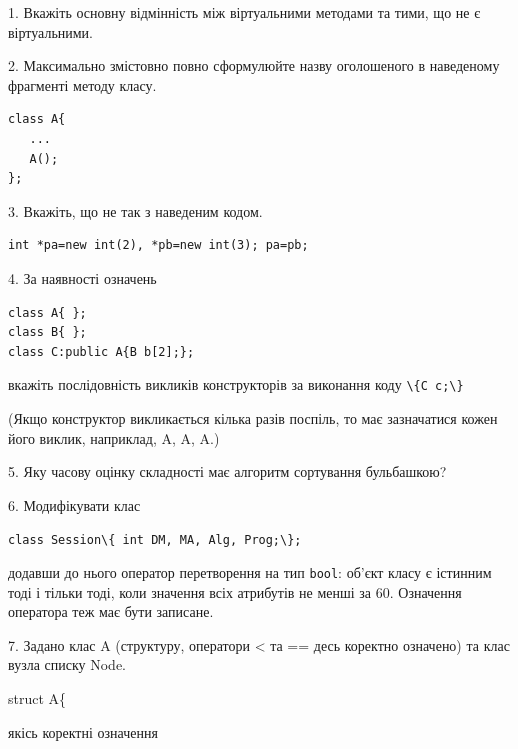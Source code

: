 \documentclass[12pt, ukrainian]{article}
\def\code#1{\Verb!#1!}
\begin{document}
{%
1. Вкажіть основну відмінність між віртуальними методами та тими, що не є віртуальними.%
\par
\vspace{2mm}
2. Максимально змістовно повно сформулюйте назву оголошеного в наведеному фрагменті методу класу.
\vspace{-3mm}
\begin{verbatim}class A{
   ...
   A();
};\end{verbatim}
\vspace{-3mm}
\par
\vspace{2mm}
3. Вкажіть, що не так з наведеним кодом.
\vspace{-3mm}
\begin{verbatim}int *pa=new int(2), *pb=new int(3); pa=pb;\end{verbatim}
\vspace{-3mm}
\par
\vspace{2mm}
4. За наявності означень
\vspace{-3mm}
\begin{verbatim}
class A{ };
class B{ };
class C:public A{B b[2];};\end{verbatim}
\vspace{-3mm}
вкажіть послідовність викликів конструкторів за виконання коду \code{\{C c;\}} 

(Якщо конструктор викликається кілька разів поспіль, то має зазначатися кожен його виклик, наприклад, A, A, A.)

\vspace{2mm}
5. Яку часову оцінку складності має алгоритм сортування бульбашкою?
\par
\vspace{2mm}
6. Модифікувати клас 

\qquad\code{class Session\{ int DM, MA, Alg, Prog;\};} 


додавши до нього оператор перетворення на тип \code{bool}: об'єкт класу є істинним тоді і тільки тоді, коли значення всіх атрибутів не менші за 60. Означення оператора теж має бути записане.%
\par
\vspace{2mm}
7. 
Задано клас A (структуру, оператори < та == десь коректно означено) та клас вузла списку Node.

struct A\{

\quad  якісь коректні означення 

}
\end{document}
